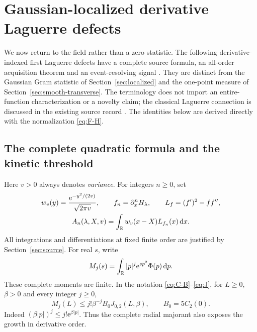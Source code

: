 \section{Gaussian-localized derivative Laguerre defects}
\label{sec:gaussian-laguerre}

We now return to the field rather than a zero statistic. The following
derivative-indexed first Laguerre defects have a complete source formula,
an all-order acquisition theorem and an event-resolving signal
\cite{GaussianLaguerreProof,LocalizedMetricsAssessment}. They are distinct
from the Gaussian Gram statistic of Section~\ref{sec:localized} and the
one-point measure of Section~\ref{sec:smooth-transverse}. The terminology
does not import an entire-function characterization or a novelty claim;
the classical Laguerre connection is discussed in the existing source
record \cite{Csordas2014PositiveKernels}. The identities below are derived
directly with the normalization \eqref{eq:F-H}.

\subsection{The complete quadratic formula and the kinetic threshold}
Here \(v>0\) always denotes \emph{variance}. For integers \(n\ge0\), set
\begin{equation}\label{eq:gaussian-defect}
 \begin{gathered}
 w_v(y)=\frac{\mathrm e^{-y^2/(2v)}}{\sqrt{2\pi v}},\qquad
 f_n=\partial_x^nH_\lambda,\qquad L_f=(f')^2-ff'',\\
 A_n(\lambda,X,v)=\int_\mathbb R w_v(x-X)L_{f_n}(x)\,\mathrm d x.
 \end{gathered}
\end{equation}
All integrations and differentiations at fixed finite order are justified
by Section~\ref{sec:source}. For real \(s\), write
\begin{equation}\label{eq:laguerre-source-moments}
 M_j(s)=\int_\mathbb R |p|^j\mathrm e^{sp^2}\Phi(p)\,\mathrm d p.
\end{equation}
These complete moments are finite. In the notation \eqref{eq:C-B}--\eqref{eq:J},
for \(L\ge0\), \(\beta>0\) and every integer \(j\ge0\),
\begin{equation}\label{eq:gaussian-moment-order}
 M_j(L)\le j!\beta^{-j}B_0J_{0,2}(L,\beta),\qquad B_0=5C_2(0).
\end{equation}
Indeed \((\beta|p|)^j\le j!\ee^{\beta|p|}\). Thus the complete
radial majorant also exposes the growth in derivative order.

